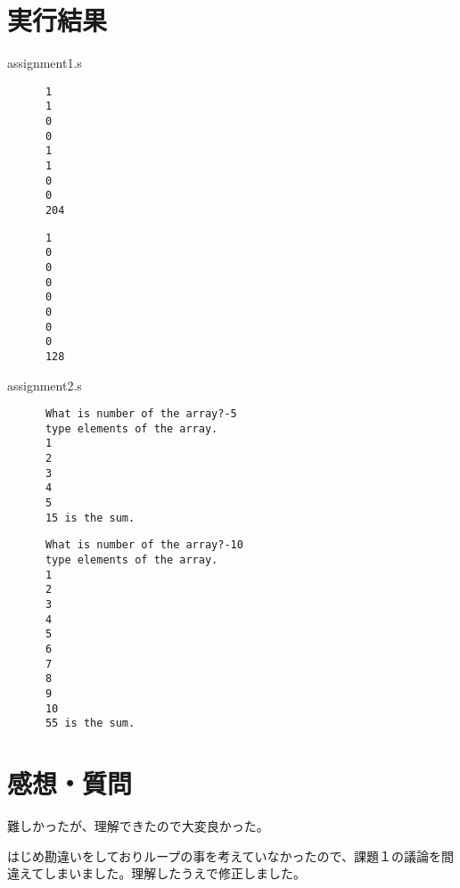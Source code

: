 \documentclass{jarticle}
\begin{document}
  \section{実行結果}
    assignment1.s
    \begin{lstlisting}
      1
      1
      0
      0
      1
      1
      0
      0
      204
    \end{lstlisting}
    \begin{lstlisting}
      1
      0
      0
      0
      0
      0
      0
      0
      128
    \end{lstlisting}

    assignment2.s
    \begin{lstlisting}
      What is number of the array?-5
      type elements of the array.
      1
      2
      3
      4
      5
      15 is the sum.
    \end{lstlisting}
    \begin{lstlisting}
      What is number of the array?-10
      type elements of the array.
      1
      2
      3
      4
      5
      6
      7
      8
      9
      10
      55 is the sum.
    \end{lstlisting}
  \section{感想・質問}
  難しかったが、理解できたので大変良かった。
  
  はじめ勘違いをしておりループの事を考えていなかったので、課題１の議論を間違えてしまいました。理解したうえで修正しました。
\end{document}
